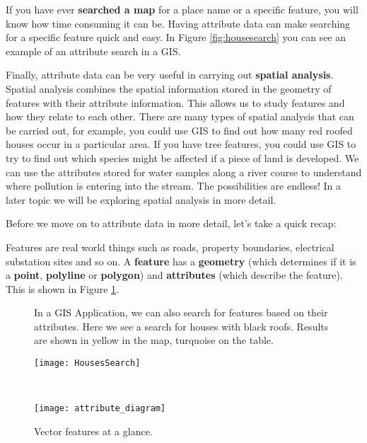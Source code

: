 If you have ever \textbf{searched a map} for a place name or a specific
feature, you
will know how time consuming it can be. Having attribute data can make
searching for a specific feature quick and easy. In Figure
\ref{fig:housesearch} you can see an example of an attribute search in a GIS. 

Finally, attribute data can be very useful in carrying out \textbf{spatial
analysis}.
Spatial analysis combines the spatial information stored in the geometry of
features with their attribute information. This allows us to study features
and how they relate to each other. There are many types of spatial analysis
that can be carried out, for example, you could use GIS to find out how many
red roofed houses occur in a particular area.  If you have tree features, you
could use GIS to try to find out which species might be affected if a piece
of land is developed. We can use the attributes stored for water samples
along a river course to understand where pollution is entering into the
stream. The possibilities are endless! In a later topic we will be exploring
spatial analysis in more detail.

Before we move on to attribute data in more detail, let's take a quick recap:

Features are real world things such as roads, property boundaries, electrical
substation sites and so on. A \textbf{feature} has a \textbf{geometry} (which
determines if it is a \textbf{point}, \textbf{polyline} or \textbf{polygon})
and \textbf{attributes} (which describe the feature).
This is shown in Figure \ref{fig:attdiagram}. 

\begin{figure}[htpb]
   \begin{minipage}[h]{\textwidth}
   \begin{center}
   \caption{In a GIS Application, we can also search for features based on
their attributes. Here we see a search for houses with black roofs. Results
are shown in yellow in the map, turquoise on the table.}
\label{fig:housesearch}\smallskip
   \texttt{[image: HousesSearch]}
   \end{center}
   \end{minipage} \\
   \vspace{1cm}
   \begin{minipage}[h]{\textwidth}
   \begin{center}
   \caption{Vector features at a glance.}
   \label{fig:attdiagram}\smallskip
   \texttt{[image: attribute\_diagram]}
   \end{center}
   \end{minipage}
\end{figure}

